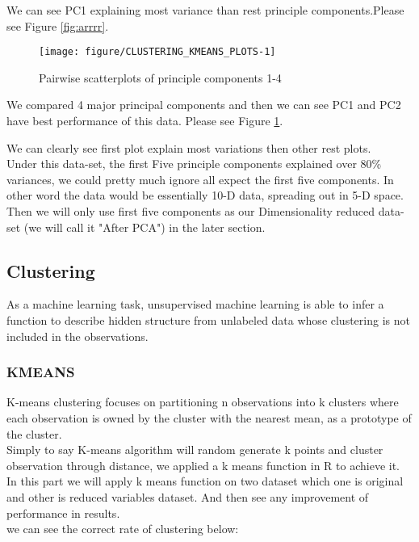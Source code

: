 \documentclass{article}\usepackage[]{graphicx}\usepackage[]{color}
\newenvironment{knitrout}{}{} %
\begin{document}
\noindent We can see PC1 explaining most variance than rest principle components.Please see Figure \ref{fig:arrrr}.\\
\begin{knitrout}
\color{fgcolor}
{\begin{figure}[htbp]
		\caption{Pairwise scatterplots of principle components 1-4}
		\centering \texttt{[image: figure/CLUSTERING\_KMEANS\_PLOTS-1]} 
		\label{fig2} 
	\end{figure}
}	
\end{knitrout}
\noindent	We compared 4 major principal components and then we can see PC1 and PC2 have best performance of this data. Please see Figure \ref{fig2}.\\	 

\begin{knitrout}
\color{fgcolor}

\end{knitrout}
	\noindent	We can clearly see first plot explain most variations then other rest plots.\\
	\noindent	Under this data-set, the first Five principle components explained over 80\% variances, we could pretty much ignore all expect the first 
	five components. In other word the data would be essentially 10-D data, spreading out in 5-D space.\\ 
	Then we will only use first five components as our Dimensionality reduced data-set (we will call it "After PCA") in the later section.\\
	\subsection{Clustering}
\noindent	As a machine learning task, unsupervised machine learning is able to infer a function to describe hidden structure from unlabeled data whose clustering is not included in the observations.\\
	\subsubsection{KMEANS}
\noindent 	K-means clustering focuses on partitioning n observations into k clusters where each observation is owned by the cluster with the nearest mean, as a prototype of the cluster. \\
\noindent Simply to say K-means algorithm will random generate k points and cluster observation through distance, we applied a k means function in R to achieve it.\\
\noindent	In this part we will apply k means function on two dataset which one is original and other is reduced variables dataset. And then see any improvement of performance in results.\\
\noindent	we can see the correct rate of clustering below:
\end{document}

